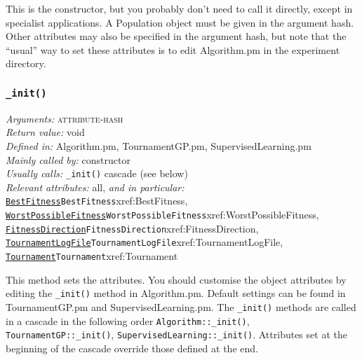 \documentclass[a4paper]{article}
\begin{document}
This is the constructor, but you probably don't need to call it
directly, except in specialist applications.  A Population object must
be given in the argument hash.  Other attributes may also be
specified in the argument hash, but note that the ``usual'' way to
set these attributes is to edit Algorithm.pm in the experiment
directory.

\subsubsection{\texttt{\_init()}}\label{Algorithm::_init}
\begin{flushleft}
\textit{Arguments:} \textsc{attribute-hash}\\
\textit{Return value:} void\\
\textit{Defined in:} Algorithm.pm, TournamentGP.pm, SupervisedLearning.pm\\
\textit{Mainly called by:} constructor\\
\textit{Usually calls:} \texttt{\_init()} cascade (see below)\\
\textit{Relevant attributes:} all, \textit{and in particular:} \hyperref[no]{\texttt{BestFitness}}{\texttt{BestFitness}}{xref:BestFitness}, \hyperref[no]{\texttt{WorstPossibleFitness}}{\texttt{WorstPossibleFitness}}{xref:WorstPossibleFitness}, \hyperref[no]{\texttt{FitnessDirection}}{\texttt{FitnessDirection}}{xref:FitnessDirection}, \hyperref[no]{\texttt{TournamentLogFile}}{\texttt{TournamentLogFile}}{xref:TournamentLogFile}, \hyperref[no]{\texttt{Tournament}}{\texttt{Tournament}}{xref:Tournament}
\end{flushleft}


\sloppy This method sets the attributes.  You should customise the
object attributes by editing the \texttt{\_init()} method in
Algorithm.pm.  Default settings can be found in TournamentGP.pm and
SupervisedLearning.pm.  The \texttt{\_init()} methods are called in a
cascade in the following order \texttt{Algorithm::\_init()},
\texttt{TournamentGP::\_init()},
\texttt{SupervisedLearning::\_init()}.  Attributes set at the
beginning of the cascade override those defined at the end.
\end{document}
